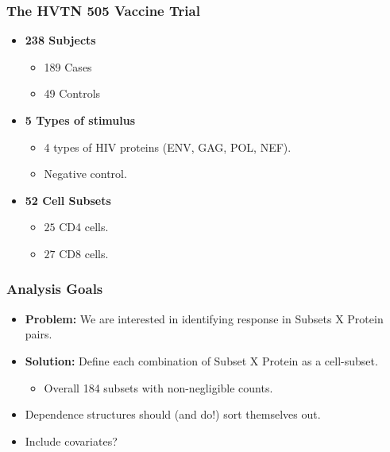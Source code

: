 \documentclass{beamer}
\theoremstyle{definition}
\begin{document}

\begin{frame}
\frametitle{The HVTN 505 Vaccine Trial}
\begin{itemize}
\item \textbf{238 Subjects}
	\begin{itemize}
	\item 189 Cases
	\item 49 Controls
	\end{itemize}
\vspace{0.2 cm}
\item \textbf{5 Types of stimulus} 
	\begin{itemize}
	\item 4 types of HIV proteins (ENV, GAG, POL, NEF).
	\item Negative control.
	\end{itemize}
\vspace{0.2 cm}
\item \textbf{52 Cell Subsets}
	\begin{itemize}
	\item $25$ CD4 cells.
	\item $27$ CD8 cells.
	\end{itemize} 
\end{itemize}
\end{frame}


\begin{frame}
\frametitle{Analysis Goals}
\begin{itemize}
\item \textbf{Problem:} We are interested in identifying response in Subsets X Protein pairs. 

\pause
\vspace{0.5 cm}
\item \textbf{Solution:} Define each combination of Subset X Protein as a cell-subset.
	\begin{itemize}
	\item Overall 184 subsets with non-negligible counts. 
	\end{itemize}

\vspace{0.5 cm}
\item Dependence structures should (and do!) sort themselves out.

\pause
\vspace{0.5 cm}
\item Include covariates?
\end{itemize}
\end{frame}
\end{document}
